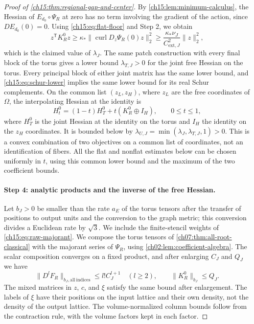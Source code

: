 \begin{proof}[Proof of \cref{ch15:thm:regional-gap-and-center}]
By \cref{ch15:lem:minimum-calculus}, the Hessian of $E_{d_0}\circ\Psi_R$ at zero has no term involving the gradient of the action, since $DE_{d_0}(0)=0$. Using \eqref{ch15:eq:flat-floor} and Step 2, we obtain
\begin{equation}\label{ch15:eq:regional-flat-gap}
 z^{\mathsf T}K_R^0z
 \ge\kappa_*\|\operatorname{curl}D_z\Psi_R(0)z\|_2^2
 \ge\frac{\kappa_*\nu_J}{C_{\mathrm{ext},J}^2}\|z\|_2^2 ,
\end{equation}
which is the claimed value of $\lambda_J$. The same patch construction with every final block of the torus gives a lower bound $\lambda_{T,J}>0$ for the joint free Hessian on the torus. Every principal block of either joint matrix has the same lower bound, and \eqref{ch15:eq:schur-lower} implies the same lower bound for its real Schur complements. On the common list $(z_L,z_H)$, where $z_L$ are the free coordinates of $\Omega$, the interpolating Hessian at the identity is
\[
 H_t^0=(1-t)H_T^0+t(K_R^0\oplus I_H),\qquad 0\le t\le1,
\]
where $H_T^0$ is the joint Hessian at the identity on the torus and $I_H$ the identity on the $z_H$ coordinates. It is bounded below by $\lambda_{U,J}=\min(\lambda_J,\lambda_{T,J},1)>0$. This is a convex combination of two objectives on a common list of coordinates, not an identification of fibers. All the flat and nonflat estimates below can be chosen uniformly in $t$, using this common lower bound and the maximum of the two coefficient bounds.

\paragraph{Step 4: analytic products and the inverse of the free Hessian.}
Let $b_J>0$ be smaller than the rate $a_E$ of the torus tensors after the transfer of positions to output units and the conversion to the graph metric; this conversion divides a Euclidean rate by $\sqrt3$. We include the finite-stencil weights of \eqref{ch15:eq:raw-majorant}. We compose the torus tensors of \cref{ch07:thm:all-root-classical} with the majorant series of $\Psi_R$, using \cref{ch02:lem:coefficient-algebra}. The scalar composition converges on a fixed product, and after enlarging $C_J$ and $Q_J$ we have
\begin{equation}\label{ch15:eq:objective-tensors}
 \|D^l F_R\|_{b_J,\mathrm{all\ indices}}
          \le l!C_J^{l+1}\quad(l\ge2),\qquad
 \|K_R^0\|_{b_J}\le Q_J .
\end{equation}
The mixed matrices in $z$, $c$, and $\xi$ satisfy the same bound after enlargement. The labels of $\xi$ have their positions on the input lattice and their own density, not the density of the output lattice. The volume-normalized column bounds follow from the contraction rule, with the volume factors kept in each factor.


\end{proof}
